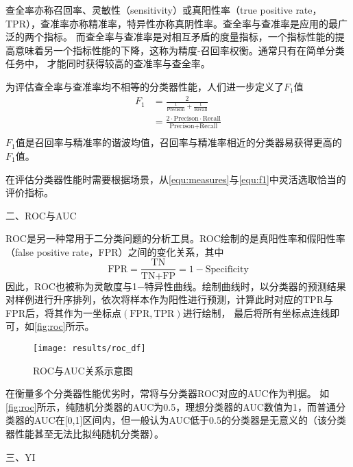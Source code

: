 查全率亦称召回率、灵敏性（sensitivity）或真阳性率（true positive rate，TPR），查准率亦称精准率，特异性亦称真阴性率。查全率与查准率是应用的最广泛的两个指标\cite{Zhou2016,Aurélien2018}。
而查全率与查准率是对相互矛盾的度量指标，一个指标性能的提高意味着另一个指标性能的下降，这称为精度-召回率权衡。通常只有在简单分类任务中，
才能同时获得较高的查准率与查全率。

为评估查全率与查准率均不相等的分类器性能，人们进一步定义了$F_1$值
\begin{equation}
      \label{equ:f1}
      \begin{aligned}
            F_1   &= \frac{2}{\frac{1}{\text{Precison}}+\frac{1}{\text{Recall}}}         \\
                  &=\frac{2\cdot \text{Precison}\cdot \text{Recall}}{\text{Precison+Recall}}          \\
      \end{aligned}
\end{equation}
$F_1$值是召回率与精准率的谐波均值，召回率与精准率相近的分类器易获得更高的$F_1$值。

在评估分类器性能时需要根据场景，从\autoref{equ:measures}与\autoref{equ:f1}中灵活选取恰当的评价指标。

二、ROC与AUC

ROC是另一种常用于二分类问题的分析工具。ROC绘制的是真阳性率和假阳性率（false positive rate，FPR）之间的变化关系，其中
\begin{equation}
      \label{equ:fpr}
      \text{FPR}=\frac{\text{TN}}{\text{TN+FP}}=1-\text{Specificity}
\end{equation}
因此，ROC也被称为灵敏度与1$-$特异性曲线。绘制曲线时，以分类器的预测结果对样例进行升序排列，依次将样本作为阳性进行预测，计算此时对应的TPR与FPR后，将其作为一坐标点$(\text{FPR},\text{TPR})$进行绘制，
最后将所有坐标点连线即可，如\autoref{fig:roc}所示。
\begin{figure}[htbp]
      \centering
      \texttt{[image: results/roc\_df]}
      \caption[ROC曲线与AUC关系示意图]{\label{fig:roc}ROC与AUC关系示意图}
\end{figure}

在衡量多个分类器性能优劣时，常将与分类器ROC对应的AUC作为判据。
如\autoref{fig:roc}所示，纯随机分类器的AUC为0.5，理想分类器的AUC数值为1，而普通分类器的AUC在[0,1]区间内，但一般认为AUC低于0.5的分类器是无意义的（该分类器性能甚至无法比拟纯随机分类器）\cite{Aurélien2018}。

三、YI

